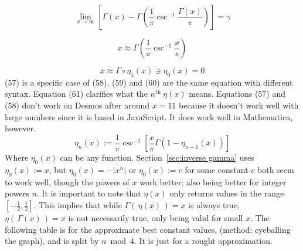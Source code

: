 \documentclass[12pt]{article}
\providecommand \pgrp [1] {\left( #1 \right)}   %
\providecommand \bgrp [1] {\left[ #1 \right]}   %
\providecommand \abs [1] {\left| #1\right|}
\providecommand \vpx  [1] {\vspace{#1px}}
\begin{document}
\begin{equation}
	\lim_{x \to \infty}\bgrp{\Gamma(x) - \Gamma\!\pgrp{\dfrac 1\pi\csc^{-1}
	\dfrac{\Gamma(x)}\pi}} = \gamma
\end{equation} %

\begin{equation}
	x \approx \Gamma\!\pgrp{\dfrac 1\pi \csc^{-1}\dfrac x\pi}
\end{equation} %

\begin{equation}
	x \approx \Gamma \circ \eta_1(x) \ni \eta_0(x) = 0
\end{equation} %
(57) is a specific case of (58). (59) and (60) are the same equation with
different syntax. Equation (61) clarifies what the $n^\text{th}~\eta(x)$ means.
Equations (57) and (58) don't work on Desmos after around $x = 11$ because it
doesn't work well with large numbers since it is based in JavaScript. It does
work well in Mathematica, however.\\
\begin{equation}
	\eta_n(x) := \dfrac 1\pi \csc^{-1}\!\bgrp{\dfrac x\pi\Gamma(1 - \eta_{n-1}(x))}
\end{equation}
Where $\eta_0(x)$ can be any function. Section~\ref{sec:inverse gamma} uses
$\eta_0(x) := x$, but $\eta_0(x) = -\abs{x^n}$ or $\eta_0(x) := c$ for some constant
$c$ both seem to work well, though the powers of $x$ work better; also being better
for integer powers $n$. It is important to note that $\eta(x)$ only returns values
in the range $\bgrp{-\frac 12, \frac 12}$. This implies that while
$\Gamma(\,\eta(x)\,) = x$ is always true, $\eta(\,\Gamma(x)\,) = x$ is not
necessarily true, only being valid for small $x$. The following table is for the
approximate best constant values, (method: eyeballing the graph), and is split by
$n\bmod4$. It is just for a rought approximation.\vpx{14}\\
\end{document}
